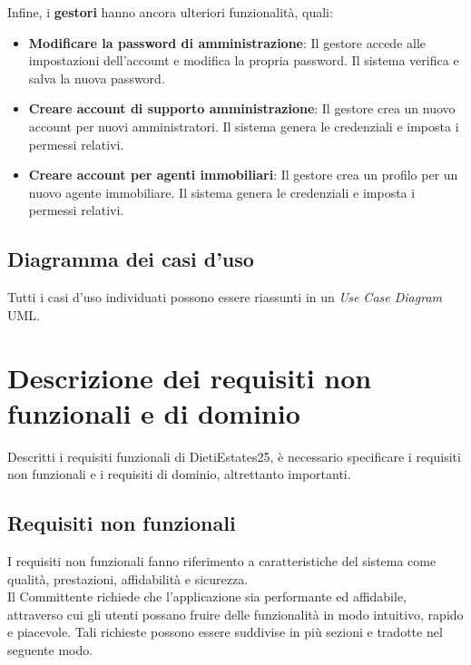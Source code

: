 \documentclass{book}
\begin{document}
Infine, i \textbf{gestori} hanno ancora ulteriori funzionalità, quali:
\begin{itemize}
    \item \textbf{Modificare la password di amministrazione}: Il gestore accede alle impostazioni dell'account e modifica la propria password. Il sistema verifica e salva la nuova password.
    \item \textbf{Creare account di supporto amministrazione}: Il gestore crea un nuovo account per nuovi amministratori. Il sistema genera le credenziali e imposta i permessi relativi.
    \item \textbf{Creare account per agenti immobiliari}: Il gestore crea un profilo per un nuovo agente immobiliare. Il sistema genera le credenziali e imposta i permessi relativi.
\end{itemize}

\subsection{Diagramma dei casi d'uso}
Tutti i casi d'uso individuati possono essere riassunti in un \textit{Use Case Diagram} UML\@.

\newpage
\section{Descrizione dei requisiti non funzionali e di dominio}
Descritti i requisiti funzionali di DietiEstates25, è necessario specificare i requisiti non funzionali e i requisiti di dominio, altrettanto importanti.

\subsection{Requisiti non funzionali}
I requisiti non funzionali fanno riferimento a caratteristiche del sistema come qualità, prestazioni, affidabilità e sicurezza.\\
Il Committente richiede che l'applicazione sia performante ed affidabile, attraverso cui gli utenti possano fruire delle funzionalità in modo intuitivo, rapido e piacevole. Tali richieste possono essere suddivise in più sezioni e tradotte nel seguente modo.
\end{document}
